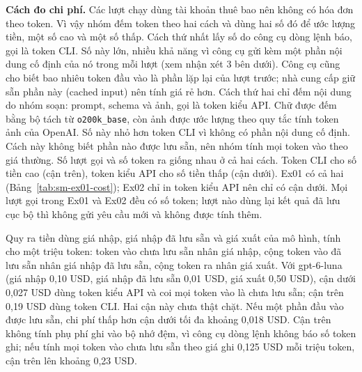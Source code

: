 \textbf{Cách đo chi phí.}
Các lượt chạy dùng tài khoản thuê bao nên không có hóa đơn theo token.
Vì vậy nhóm đếm token theo hai cách và dùng hai số đó để ước lượng tiền, một số cao và một số thấp.
Cách thứ nhất lấy số do công cụ dòng lệnh báo, gọi là token CLI.
Số này lớn, nhiều khả năng vì công cụ gửi kèm một phần nội dung cố định của nó trong mỗi lượt (xem nhận xét 3 bên dưới).
Công cụ cũng cho biết bao nhiêu token đầu vào là phần lặp lại của lượt trước; nhà cung cấp giữ sẵn phần này (cached input) nên tính giá rẻ hơn.
Cách thứ hai chỉ đếm nội dung do nhóm soạn: prompt, schema và ảnh, gọi là token kiểu API.
Chữ được đếm bằng bộ tách từ \texttt{o200k\_base}, còn ảnh được ước lượng theo quy tắc tính token ảnh của OpenAI.
Số này nhỏ hơn token CLI vì không có phần nội dung cố định.
Cách này không biết phần nào được lưu sẵn, nên nhóm tính mọi token vào theo giá thường.
Số lượt gọi và số token ra giống nhau ở cả hai cách.
Token CLI cho số tiền cao (cận trên), token kiểu API cho số tiền thấp (cận dưới).
Ex01 có cả hai (Bảng~\ref{tab:sm-ex01-cost}); Ex02 chỉ in token kiểu API nên chỉ có cận dưới.
Mọi lượt gọi trong Ex01 và Ex02 đều có số token; lượt nào dùng lại kết quả đã lưu cục bộ thì không gửi yêu cầu mới và không được tính thêm.


Quy ra tiền dùng giá nhập, giá nhập đã lưu sẵn và giá xuất của mô hình, tính cho một triệu token: token vào chưa lưu sẵn nhân giá nhập, cộng token vào đã lưu sẵn nhân giá nhập đã lưu sẵn, cộng token ra nhân giá xuất.
Với gpt-6-luna (giá nhập 0,10 USD, giá nhập đã lưu sẵn 0,01 USD, giá xuất 0,50 USD), cận dưới 0,027 USD dùng token kiểu API và coi mọi token vào là chưa lưu sẵn; cận trên 0,19 USD dùng token CLI.
Hai cận này chưa thật chặt.
Nếu một phần đầu vào được lưu sẵn, chi phí thấp hơn cận dưới tối đa khoảng 0,018 USD.
Cận trên không tính phụ phí ghi vào bộ nhớ đệm, vì công cụ dòng lệnh không báo số token ghi; nếu tính mọi token vào chưa lưu sẵn theo giá ghi 0,125 USD mỗi triệu token, cận trên lên khoảng 0,23 USD.

\begin{table}[t]
\centering
\caption{Chi phí Ex01 theo bước, lượt gpt-6-luna trên bài ``Cấu tạo hệ thần kinh''. Token vào CLI gồm ngữ cảnh cố định của công cụ; token vào kiểu API là số đếm trên prompt và schema, cộng token ảnh ước lượng. Chưa gồm tiền xử lý và ghép, cắt video (không đo được vì thiếu video và PDF gốc); tạo âm thanh chạy cục bộ nên không có lượt gọi.}
\label{tab:sm-ex01-cost}
\small
\setlength{\tabcolsep}{3pt}

\end{table}

